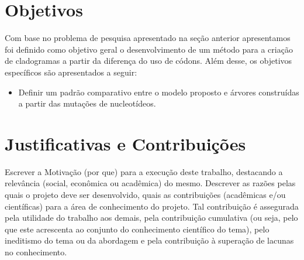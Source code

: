 \documentclass[font=plain]{abnt}
\begin{document}

\chapter{Objetivos}
Com base no problema de pesquisa apresentado na seção anterior apresentamos foi definido como objetivo geral o desenvolvimento de um método para a criação de cladogramas a partir da diferença do uso de códons. Além desse, os objetivos específicos são apresentados a seguir:
\begin{itemize}
    \item Definir um padrão comparativo entre o modelo proposto e árvores construídas a partir das mutações de nucleotídeos.
\end{itemize}



\chapter{Justificativas e Contribuições}
Escrever a Motivação (por que) para a execução deste trabalho, destacando a relevância (social, econômica ou acadêmica) do mesmo. Descrever as razões pelas quais o projeto deve ser desenvolvido, quais as contribuições (acadêmicas e/ou científicas) para a área de conhecimento do projeto. Tal contribuição é assegurada pela utilidade do trabalho aos demais, pela contribuição cumulativa (ou seja, pelo que este acrescenta ao conjunto do conhecimento científico do tema), pelo ineditismo do tema ou da abordagem e pela contribuição à superação de lacunas no conhecimento.
\end{document}
